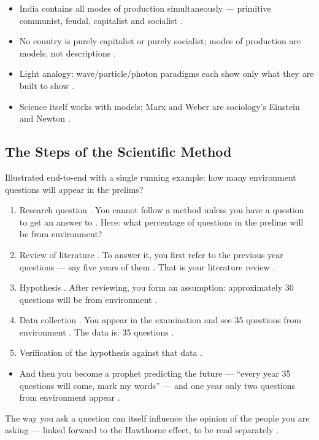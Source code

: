 \begin{QuickRevision}
\begin{itemize}
    \item India contains all modes of production simultaneously --- primitive communist, feudal, capitalist and socialist .
    \item No country is purely capitalist or purely socialist; modes of production are models, not descriptions .
    \item Light analogy: wave/particle/photon paradigms each show only what they are built to show .
    \item Science itself works with models; Marx and Weber are sociology's Einstein and Newton .
\end{itemize}
\end{QuickRevision}

\subsection{The Steps of the Scientific Method}
Illustrated end-to-end with a single running example: how many environment questions will appear in the prelims? 
\begin{enumerate}
    \item Research question . You cannot follow a method unless you have a question to get an answer to . Here: what percentage of questions in the prelims will be from environment? 
    \item Review of literature . To answer it, you first refer to the previous year questions --- say five years of them . That is your literature review .
    \item Hypothesis . After reviewing, you form an assumption: approximately 30 questions will be from environment .
    \item Data collection . You appear in the examination and see 35 questions from environment . The data is: 35 questions .
    \item Verification of the hypothesis against that data .
\end{enumerate}
\begin{itemize}
    \item And then you become a prophet predicting the future --- ``every year 35 questions will come, mark my words'' --- and one year only two questions from environment appear .
\end{itemize}

\begin{CriticalPoint}
The way you ask a question can itself influence the opinion of the people you are asking --- linked forward to the Hawthorne effect, to be read separately .
\end{CriticalPoint}

